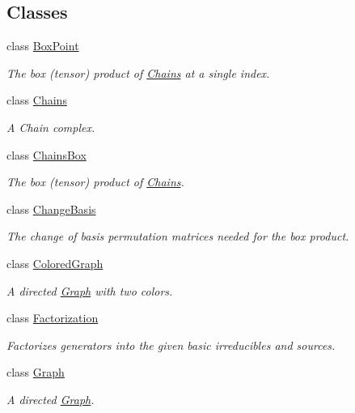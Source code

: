\subsection*{Classes}
\begin{DoxyCompactItemize}
\item 
class \hyperlink{classMackey_1_1BoxPoint}{Box\+Point}
\begin{DoxyCompactList}\small\item\em The box (tensor) product of \hyperlink{classMackey_1_1Chains}{Chains} at a single index. \end{DoxyCompactList}\item 
class \hyperlink{classMackey_1_1Chains}{Chains}
\begin{DoxyCompactList}\small\item\em A Chain complex. \end{DoxyCompactList}\item 
class \hyperlink{classMackey_1_1ChainsBox}{Chains\+Box}
\begin{DoxyCompactList}\small\item\em The box (tensor) product of \hyperlink{classMackey_1_1Chains}{Chains}. \end{DoxyCompactList}\item 
class \hyperlink{classMackey_1_1ChangeBasis}{Change\+Basis}
\begin{DoxyCompactList}\small\item\em The change of basis permutation matrices needed for the box product. \end{DoxyCompactList}\item 
class \hyperlink{classMackey_1_1ColoredGraph}{Colored\+Graph}
\begin{DoxyCompactList}\small\item\em A directed \hyperlink{classMackey_1_1Graph}{Graph} with two colors. \end{DoxyCompactList}\item 
class \hyperlink{classMackey_1_1Factorization}{Factorization}
\begin{DoxyCompactList}\small\item\em Factorizes generators into the given basic irreducibles and sources. \end{DoxyCompactList}\item 
class \hyperlink{classMackey_1_1Graph}{Graph}
\begin{DoxyCompactList}\small\item\em A directed \hyperlink{classMackey_1_1Graph}{Graph}. \end{DoxyCompactList}\item 

\end{DoxyCompactItemize}

